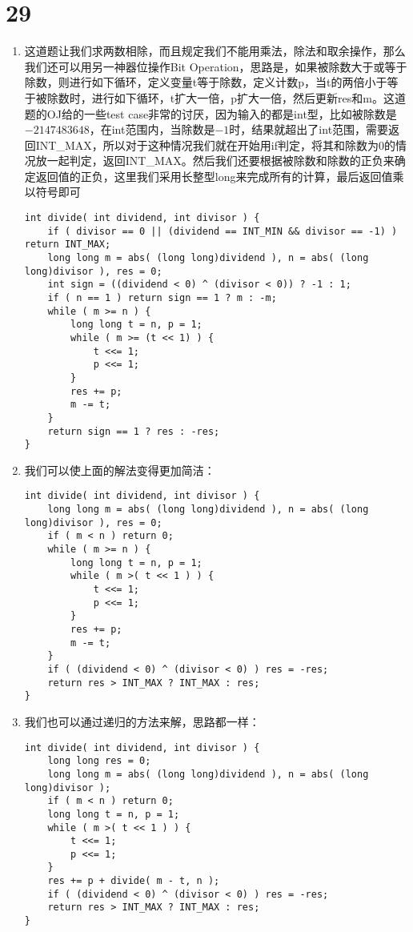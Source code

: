 \documentclass[12pt,a4paper]{article}
\begin{document}
\section{29}
\begin{enumerate}
\item
\begin{CJK}{UTF8}{gbsn}
这道题让我们求两数相除，而且规定我们不能用乘法，除法和取余操作，那么我们还可以用另一神器位操作Bit Operation，思路是，如果被除数大于或等于除数，则进行如下循环，定义变量t等于除数，定义计数p，当t的两倍小于等于被除数时，进行如下循环，t扩大一倍，p扩大一倍，然后更新res和m。这道题的OJ给的一些test case非常的讨厌，因为输入的都是int型，比如被除数是$-2147483648$，在int范围内，当除数是$-1$时，结果就超出了int范围，需要返回INT\_MAX，所以对于这种情况我们就在开始用if判定，将其和除数为0的情况放一起判定，返回INT\_MAX。然后我们还要根据被除数和除数的正负来确定返回值的正负，这里我们采用长整型long来完成所有的计算，最后返回值乘以符号即可
\end{CJK}
\begin{lstlisting}
int divide( int dividend, int divisor ) {
	if ( divisor == 0 || (dividend == INT_MIN && divisor == -1) ) return INT_MAX;
	long long m = abs( (long long)dividend ), n = abs( (long long)divisor ), res = 0;
	int sign = ((dividend < 0) ^ (divisor < 0)) ? -1 : 1;
	if ( n == 1 ) return sign == 1 ? m : -m;
	while ( m >= n ) {
		long long t = n, p = 1;
		while ( m >= (t << 1) ) {
			t <<= 1;
			p <<= 1;
		}
		res += p;
		m -= t;
	}
	return sign == 1 ? res : -res;
}
\end{lstlisting}
\item
\begin{CJK}{UTF8}{gbsn}
我们可以使上面的解法变得更加简洁：
\end{CJK}
\begin{lstlisting}
int divide( int dividend, int divisor ) {
	long long m = abs( (long long)dividend ), n = abs( (long long)divisor ), res = 0;
	if ( m < n ) return 0;
	while ( m >= n ) {
		long long t = n, p = 1;
		while ( m >( t << 1 ) ) {
			t <<= 1;
			p <<= 1;
		}
		res += p;
		m -= t;
	}
	if ( (dividend < 0) ^ (divisor < 0) ) res = -res;
	return res > INT_MAX ? INT_MAX : res;
}
\end{lstlisting}
\item
\begin{CJK}{UTF8}{gbsn}
我们也可以通过递归的方法来解，思路都一样：
\end{CJK}
\begin{lstlisting}
int divide( int dividend, int divisor ) {
	long long res = 0;
	long long m = abs( (long long)dividend ), n = abs( (long long)divisor );
	if ( m < n ) return 0;
	long long t = n, p = 1;
	while ( m >( t << 1 ) ) {
		t <<= 1;
		p <<= 1;
	}
	res += p + divide( m - t, n );
	if ( (dividend < 0) ^ (divisor < 0) ) res = -res;
	return res > INT_MAX ? INT_MAX : res;
}
\end{lstlisting}
\end{enumerate}
\end{document}
